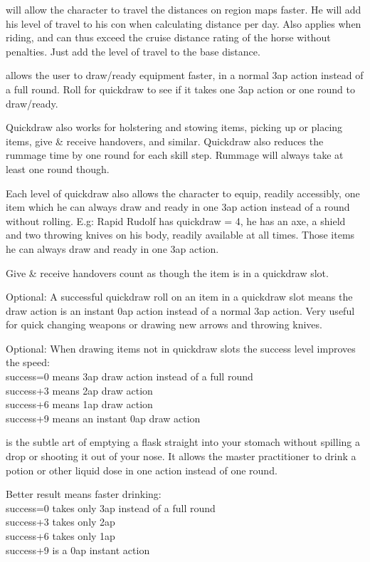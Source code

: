 will allow the character to travel the distances on region maps faster. He will add his level of travel to his con when calculating distance per day. Also applies when riding, and can thus exceed the cruise distance rating of the horse without penalties. Just add the level of travel to the base distance.


 allows the user to draw/ready equipment faster, in a normal 3ap action instead of a full round. Roll for quickdraw to see if it takes one 3ap action or one round to draw/ready. 

Quickdraw also works for holstering and stowing items, picking up or placing items, give \& receive handovers, and similar. %
Quickdraw also reduces the rummage time by one round for each skill step. Rummage will always take at least one round though.

Each level of quickdraw also allows the character to equip, readily accessibly, one item which he can always draw and ready in one 3ap action instead of a round without rolling.
E.g: Rapid Rudolf has quickdraw = 4, he has an axe, a shield and two throwing knives on his body, readily available at all times. Those items he can always draw and ready in one 3ap action.

Give \& receive handovers count as though the item is in a quickdraw slot. %

Optional: A successful quickdraw roll on an item in a quickdraw slot means the draw action is an instant 0ap action instead of a normal 3ap action. Very useful for quick changing weapons or drawing new arrows and throwing knives.

Optional: When drawing items not in quickdraw slots the success level improves the speed:\\
success=0 means 3ap draw action instead of a full round\\
success+3 means 2ap draw action\\
success+6 means 1ap draw action\\
success+9 means an instant 0ap draw action


 is the subtle art of emptying a flask straight into your stomach without spilling a drop or shooting it out of your nose. It allows the master practitioner to drink a potion or other liquid dose in one action instead of one round.

Better result means faster drinking:\\
success=0 takes only 3ap instead of a full round\\
success+3 takes only 2ap\\
success+6 takes only 1ap\\
success+9 is a 0ap instant action


